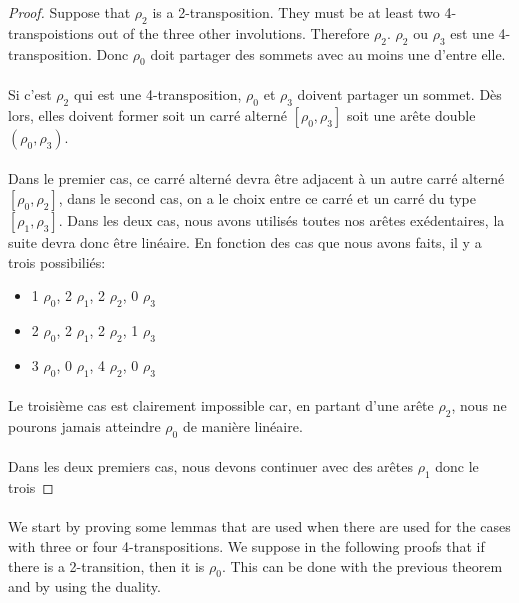 \begin{proof}
  Suppose that $\rho_2$ is a 2-transposition. They must be at least two 4-transpoistions out of the three other involutions. Therefore $\rho_2$.
  $\rho_2$ ou $\rho_3$ est une 4-transposition. Donc $\rho_0$ doit partager des sommets avec au moins une d'entre elle.

  \paragraph{}
  Si c'est $\rho_2$ qui est une 4-transposition, $\rho_0$ et $\rho_3$ doivent partager un sommet. Dès lors, elles doivent former soit un carré alterné $[\rho_0, \rho_3]$ soit une arête double $(\rho_0, \rho_3)$.

  \paragraph{}
  Dans le premier cas, ce carré alterné devra être adjacent à un autre carré alterné $[\rho_0, \rho_2]$, dans le second cas, on a le choix entre ce carré et un carré du type $[\rho_1, \rho_3]$. Dans les deux cas, nous avons utilisés toutes nos arêtes exédentaires, la suite devra donc être linéaire. En fonction des cas que nous avons faits, il y a trois possibiliés:

  \begin{itemize}
    \item 1 $\rho_0$, 2 $\rho_1$, 2 $\rho_2$, 0 $\rho_3$
    \item 2 $\rho_0$, 2 $\rho_1$, 2 $\rho_2$, 1 $\rho_3$
    \item 3 $\rho_0$, 0 $\rho_1$, 4 $\rho_2$, 0 $\rho_3$
  \end{itemize}

  \paragraph{}
  Le troisième cas est clairement impossible car, en partant d'une arête $\rho_2$, nous ne pourons jamais atteindre $\rho_0$ de manière linéaire.

  \paragraph{}
  Dans les deux premiers cas, nous devons continuer avec des arêtes $\rho_1$ donc le trois

\end{proof}

\paragraph{}
We start by proving some lemmas that are used when there are used for the cases with three or four 4-transpositions. We suppose in the following proofs that if there is a 2-transition, then it is $\rho_0$. This can be done with the previous theorem and by using the duality.

